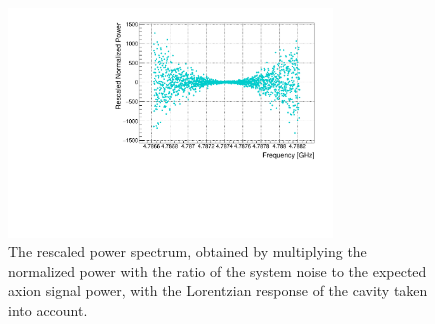 \begin{figure} [htbp]
  \centering
  \includegraphics[width=8.6cm]{figures/RescaledPower_vs_Freq_Step_0100.pdf}
  \caption{
  The rescaled power spectrum, obtained by multiplying the normalized 
power with the ratio of the system noise to the expected axion signal power, 
with the Lorentzian response of the cavity taken into account.}
  \label{fig:rescaled_power}
\end{figure}






